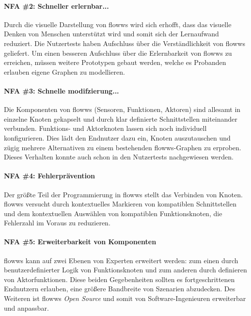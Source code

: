 \paragraph{NFA \#2: Schneller erlernbar...} Durch die visuelle Darstellung von flowws wird sich erhofft, dass das visuelle Denken von Menschen unterstützt wird und somit sich der Lernaufwand reduziert. Die Nutzertests haben Aufschluss über die Verständlichkeit von flowws geliefert. Um einen besseren Aufschluss über die Erlernbarkeit von flowws zu erreichen, müssen weitere Prototypen gebaut werden, welche es Probanden erlauben eigene Graphen zu modellieren.

\paragraph{NFA \#3: Schnelle modifzierung...} Die Komponenten von flowws (Sensoren, Funktionen, Aktoren) sind allesamt in einzelne Knoten gekapselt und durch klar definierte Schnittstellen miteinander verbunden. Funktions- und Aktorknoten lassen sich noch individuell konfigurieren. Dies lädt den Endnutzer dazu ein, Knoten auszutauschen und zügig mehrere Alternativen zu einem bestehenden flowws-Graphen zu erproben. Dieses Verhalten konnte auch schon in den Nutzertests nachgewiesen werden.

\paragraph{NFA \#4: Fehlerprävention} Der größte Teil der Programmierung in flowws stellt das Verbinden von Knoten. flowws versucht durch kontextuelles Markieren von kompatiblen Schnittstellen und dem kontextuellen Auswählen von kompatiblen Funktionsknoten, die Fehlerzahl im Voraus zu reduzieren. 

\paragraph{NFA \#5: Erweiterbarkeit von Komponenten} flowws kann auf zwei Ebenen von Experten erweitert werden: zum einen durch benutzerdefinierter Logik von Funktionsknoten und zum anderen durch definieren von Aktorfunktionen. Diese beiden Gegebenheiten sollten es fortgeschrittenen Endnutzern erlauben, eine größere Bandbreite von Szenarien abzudecken. Des Weiteren ist flowws \textit{Open Source} und somit von Software-Ingenieuren erweiterbar und anpassbar.

